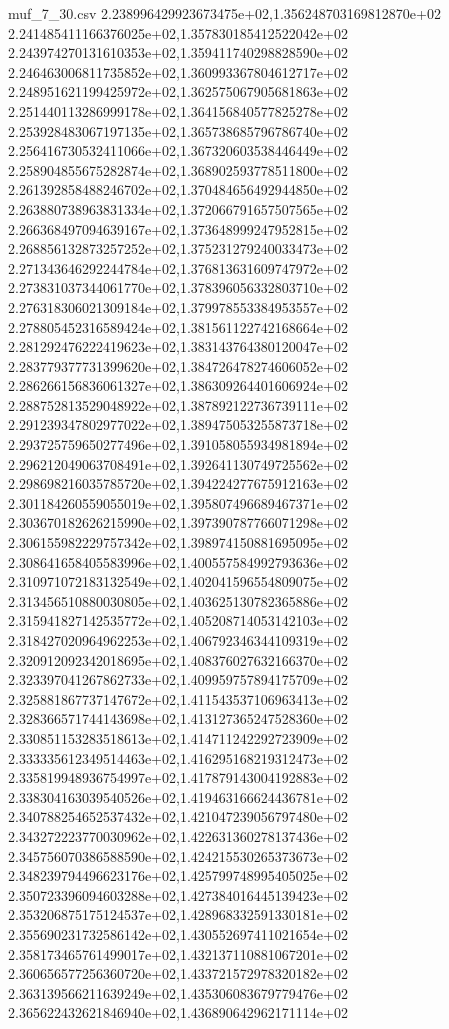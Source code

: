 \begin{filecontents*}{muf_7_30.csv}
2.238996429923673475e+02,1.356248703169812870e+02
2.241485411166376025e+02,1.357830185412522042e+02
2.243974270131610353e+02,1.359411740298828590e+02
2.246463006811735852e+02,1.360993367804612717e+02
2.248951621199425972e+02,1.362575067905681863e+02
2.251440113286999178e+02,1.364156840577825278e+02
2.253928483067197135e+02,1.365738685796786740e+02
2.256416730532411066e+02,1.367320603538446449e+02
2.258904855675282874e+02,1.368902593778511800e+02
2.261392858488246702e+02,1.370484656492944850e+02
2.263880738963831334e+02,1.372066791657507565e+02
2.266368497094639167e+02,1.373648999247952815e+02
2.268856132873257252e+02,1.375231279240033473e+02
2.271343646292244784e+02,1.376813631609747972e+02
2.273831037344061770e+02,1.378396056332803710e+02
2.276318306021309184e+02,1.379978553384953557e+02
2.278805452316589424e+02,1.381561122742168664e+02
2.281292476222419623e+02,1.383143764380120047e+02
2.283779377731399620e+02,1.384726478274606052e+02
2.286266156836061327e+02,1.386309264401606924e+02
2.288752813529048922e+02,1.387892122736739111e+02
2.291239347802977022e+02,1.389475053255873718e+02
2.293725759650277496e+02,1.391058055934981894e+02
2.296212049063708491e+02,1.392641130749725562e+02
2.298698216035785720e+02,1.394224277675912163e+02
2.301184260559055019e+02,1.395807496689467371e+02
2.303670182626215990e+02,1.397390787766071298e+02
2.306155982229757342e+02,1.398974150881695095e+02
2.308641658405583996e+02,1.400557584992793636e+02
2.310971072183132549e+02,1.402041596554809075e+02
2.313456510880030805e+02,1.403625130782365886e+02
2.315941827142535772e+02,1.405208714053142103e+02
2.318427020964962253e+02,1.406792346344109319e+02
2.320912092342018695e+02,1.408376027632166370e+02
2.323397041267862733e+02,1.409959757894175709e+02
2.325881867737147672e+02,1.411543537106963413e+02
2.328366571744143698e+02,1.413127365247528360e+02
2.330851153283518613e+02,1.414711242292723909e+02
2.333335612349514463e+02,1.416295168219312473e+02
2.335819948936754997e+02,1.417879143004192883e+02
2.338304163039540526e+02,1.419463166624436781e+02
2.340788254652537432e+02,1.421047239056797480e+02
2.343272223770030962e+02,1.422631360278137436e+02
2.345756070386588590e+02,1.424215530265373673e+02
2.348239794496623176e+02,1.425799748995405025e+02
2.350723396094603288e+02,1.427384016445139423e+02
2.353206875175124537e+02,1.428968332591330181e+02
2.355690231732586142e+02,1.430552697411021654e+02
2.358173465761499017e+02,1.432137110881067201e+02
2.360656577256360720e+02,1.433721572978320182e+02
2.363139566211639249e+02,1.435306083679779476e+02
2.365622432621846940e+02,1.436890642962171114e+02

\end{filecontents*}
